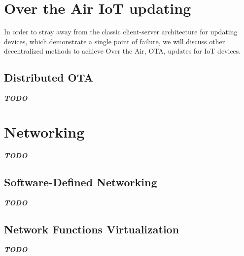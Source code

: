 
\section{Over the Air IoT updating} %
\label{sec:Over the Air  IoT updating}
In order to stray away from the classic client-server architecture for updating devices, which demonstrate a single
point of failure, we will discuss other decentralized methods to achieve Over the Air, OTA, updates for IoT devices.

\subsection{Distributed OTA} %
\label{sub:Distributed OTA}
\textbf{\textit{TODO}}

\section{Networking} %
\label{sec:Networking}
\textbf{\textit{TODO}}
\subsection{Software-Defined Networking} %
\label{sub:Software-Defined Networking}
\textbf{\textit{TODO}}

\subsection{Network Functions Virtualization} %
\label{sub:Network Functions Virtualization}
\textbf{\textit{TODO}}

